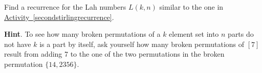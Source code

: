 \documentclass{book}
\begin{document}
\setcounter{cpjt}{201}
\addtocounter{cpjt}{-1}
\begin{activity}\label{activity-194}
\hypertarget{p-1091}{}%
Find a recurrence for the Lah numbers \(L(k,n)\) similar to the one in \hyperref[secondstirlingrecurrence]{Activity~\ref{secondstirlingrecurrence}}.%
\par\smallskip%
\noindent\textbf{Hint}.\hypertarget{hint-127}{}\quad%
\hypertarget{p-1092}{}%
To see how many broken permutations of a \(k\) element set into \(n\) parts do not have \(k\) is a part by itself, ask yourself how many broken permutations of \([7]\) result from adding 7 to the one of the two permutations in the broken permutation \(\{14, 2356\}\).%
\par\smallskip%
\noindent\end{activity}

\clearpage
\end{document}
